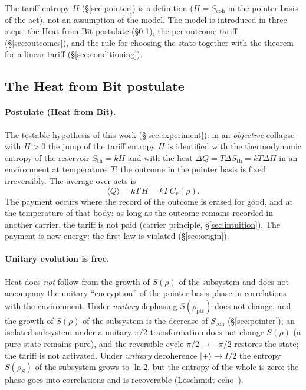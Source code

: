 \documentclass[11pt,a4paper]{article}
\newcommand{\Sref}[1]{\hyperref[#1]{\S\ref{#1}}}
\begin{document}
The tariff entropy $H$ (\Sref{sec:pointer}) is a definition ($H=S_{\mathrm{coh}}$ in the pointer basis of the act), not an assumption of the model. The model is introduced in three steps: the Heat from Bit postulate (\Sref{sec:postulate}), the per-outcome tariff (\Sref{sec:outcomes}), and the rule for choosing the state together with the theorem for a linear tariff (\Sref{sec:conditioning}).

\subsection{The Heat from Bit postulate}\label{sec:postulate}

\paragraph{Postulate (Heat from Bit).}
The testable hypothesis of this work (\Sref{sec:experiment}): in an \emph{objective} collapse with $H>0$ the jump of the tariff entropy $H$ is identified with the thermodynamic entropy of the reservoir $S_{\mathrm{th}}=kH$ and with the heat $\Delta Q=T\Delta S_{\mathrm{th}}=kT\Delta H$ in an environment at temperature~$T$; the outcome in the pointer basis is fixed irreversibly. The average over acts is
\begin{equation}
\langle Q\rangle = kT\,H = kT\,C_r(\rho).
\label{eq:tariff_mean}
\end{equation}
The payment occurs where the record of the outcome is erased for good, and at the temperature of that body; as long as the outcome remains recorded in another carrier, the tariff is not paid (carrier principle, \Sref{sec:intuition}). The payment is new energy: the first law is violated (\Sref{sec:origin}).

\paragraph{Unitary evolution is free.}
Heat does \emph{not} follow from the growth of $S(\rho)$ of the subsystem and does not accompany the unitary ``encryption'' of the pointer-basis phase in correlations with the environment. Under \emph{unitary} dephasing $S(\rho_{\mathrm{ptr}})$ does not change, and the growth of $S(\rho)$ of the subsystem is the decrease of $S_{\mathrm{coh}}$ (\Sref{sec:pointer}); an isolated subsystem under a unitary $\pi/2$ transformation does not change $S(\rho)$ (a pure state remains pure), and the reversible cycle $\pi/2\to-\pi/2$ restores the state; the tariff is not activated. Under \emph{unitary} decoherence $|{+}\rangle \to I/2$ the entropy $S(\rho_S)$ of the subsystem grows to $\ln 2$, but the entropy of the whole is zero: the phase goes into correlations and is recoverable (Loschmidt echo~\cite{gorin2006,goussev2012}).
\end{document}
